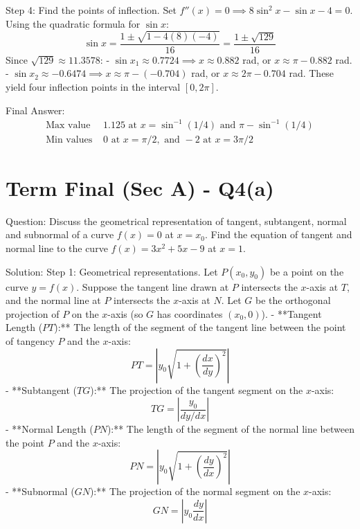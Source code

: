 \documentclass{article}
\begin{document}
Step 4: Find the points of inflection.
Set $f''(x) = 0 \implies 8\sin^2 x - \sin x - 4 = 0$.
Using the quadratic formula for $\sin x$:
\[
\sin x = \frac{1 \pm \sqrt{1 - 4(8)(-4)}}{16} = \frac{1 \pm \sqrt{129}}{16}
\]
Since $\sqrt{129} \approx 11.3578$:
- $\sin x_1 \approx 0.7724 \implies x \approx 0.882$ rad, or $x \approx \pi - 0.882$ rad.
- $\sin x_2 \approx -0.6474 \implies x \approx \pi - (-0.704)$ rad, or $x \approx 2\pi - 0.704$ rad.
These yield four inflection points in the interval $[0, 2\pi]$.

Final Answer:
\[
\boxed{
\begin{aligned}
\text{Max value } & 1.125 \text{ at } x = \sin^{-1}(1/4) \text{ and } \pi - \sin^{-1}(1/4) \\
\text{Min values } & 0 \text{ at } x = \pi/2, \text{ and } -2 \text{ at } x = 3\pi/2
\end{aligned}
}
\]

\section*{Term Final (Sec A) - Q4(a)}
Question:
Discuss the geometrical representation of tangent, subtangent, normal and subnormal of a curve $f(x) = 0$ at $x = x_0$. Find the equation of tangent and normal line to the curve $f(x) = 3x^2 + 5x - 9$ at $x = 1$.

Solution:
Step 1: Geometrical representations.
Let $P(x_0, y_0)$ be a point on the curve $y = f(x)$. Suppose the tangent line drawn at $P$ intersects the $x$-axis at $T$, and the normal line at $P$ intersects the $x$-axis at $N$. Let $G$ be the orthogonal projection of $P$ on the $x$-axis (so $G$ has coordinates $(x_0, 0)$).
- **Tangent Length ($PT$):** The length of the segment of the tangent line between the point of tangency $P$ and the $x$-axis:
  \[
  PT = \left| y_0 \sqrt{1 + \left(\frac{dx}{dy}\right)^2} \right|
  \]
- **Subtangent ($TG$):** The projection of the tangent segment on the $x$-axis:
  \[
  TG = \left| \frac{y_0}{dy/dx} \right|
  \]
- **Normal Length ($PN$):** The length of the segment of the normal line between the point $P$ and the $x$-axis:
  \[
  PN = \left| y_0 \sqrt{1 + \left(\frac{dy}{dx}\right)^2} \right|
  \]
- **Subnormal ($GN$):** The projection of the normal segment on the $x$-axis:
  \[
  GN = \left| y_0 \frac{dy}{dx} \right|
  \]
\end{document}
